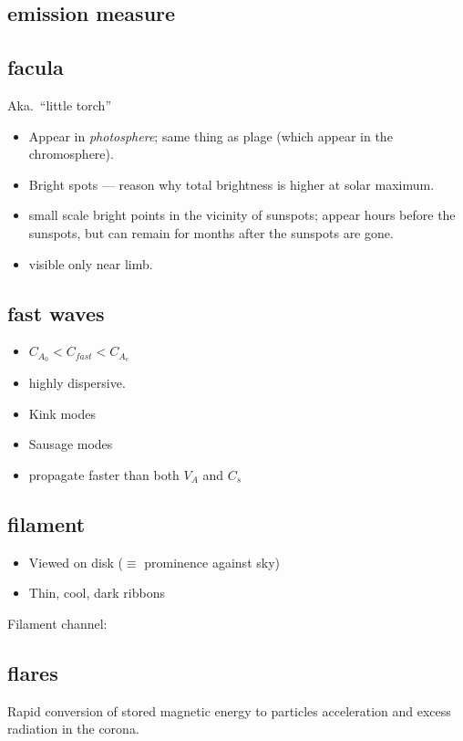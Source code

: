 \documentclass{article}
\begin{document}
\subsection{emission measure}

\subsection{facula}\label{ssec:facula}
Aka.\ ``little torch''
    \begin{itemize}
        \item Appear in \emph{photosphere}; same thing as plage
            (which appear in the chromosphere).
        \item Bright spots --- reason why total brightness is higher at
            solar maximum.
        \item small scale bright points in the vicinity of sunspots;
            appear hours before the sunspots, but can remain for months
            after the sunspots are gone.
        \item visible only near limb.
    \end{itemize}
\subsection{fast waves}

\begin{itemize}
    \item $C_{A_{0}} < C_{fast} < C_{A_{e}} $
    \item highly dispersive.
    \item Kink modes
    \item Sausage modes
    \item propagate faster than both $V_{A}$ and $C_{s}$
\end{itemize}

\subsection{filament}
    \begin{itemize}
        \item Viewed on disk ($\equiv$ prominence against sky)
        \item Thin, cool, dark ribbons
    \end{itemize}
    Filament channel:

\subsection{flares}
Rapid conversion of stored magnetic energy to particles acceleration and
excess radiation in the corona.
\end{document}
